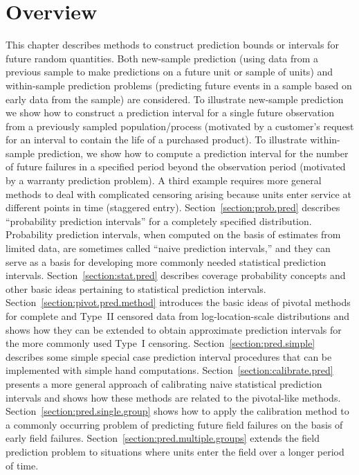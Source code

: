 \section*{Overview}
This chapter describes methods to construct prediction bounds or
intervals for future random quantities. Both new-sample prediction
(using data from a previous sample to make predictions on a future
unit or sample of units) and within-sample prediction problems
(predicting future events in a sample based on early data from the
sample) are considered.  To illustrate new-sample prediction we show
how to construct a prediction interval for a single future
observation from a previously sampled population/process (motivated
by a customer's request for an interval to contain the life of a
purchased product).  To illustrate within-sample prediction, we show
how to compute a prediction interval for the number of future
failures in a specified period beyond the observation period
(motivated by a warranty prediction problem).  A third example
requires more general methods to deal with complicated censoring
arising because units enter service at different points in time
(staggered entry).  Section~\ref{section:prob.pred} describes
``probability prediction intervals'' for a completely specified
distribution. Probability prediction intervals, when computed on the
basis of estimates from limited data, are sometimes called ``naive
prediction intervals,'' and they can serve as a basis for developing
more commonly needed statistical prediction intervals.
Section~\ref{section:stat.pred} describes coverage probability
concepts and other basic ideas pertaining to statistical prediction
intervals.  Section~\ref{section:pivot.pred.method} introduces the basic
ideas of pivotal methods for complete and Type~II censored data from
log-location-scale distributions and shows how they can be
extended to obtain approximate prediction intervals for the more
commonly used Type~I censoring. Section~\ref{section:pred.simple}
describes some simple special case prediction interval procedures
that can be implemented with simple hand computations.
Section~\ref{section:calibrate.pred} presents a more general
approach of calibrating naive statistical prediction intervals and
shows how these methods are related to the pivotal-like methods.
Section~\ref{section:pred.single.group} shows how to apply the
calibration method to a commonly occurring problem of predicting
future field failures on the basis of early field failures.
Section~\ref{section:pred.multiple.groups} extends the field
prediction problem to situations where units enter the field over a
longer period of time.


